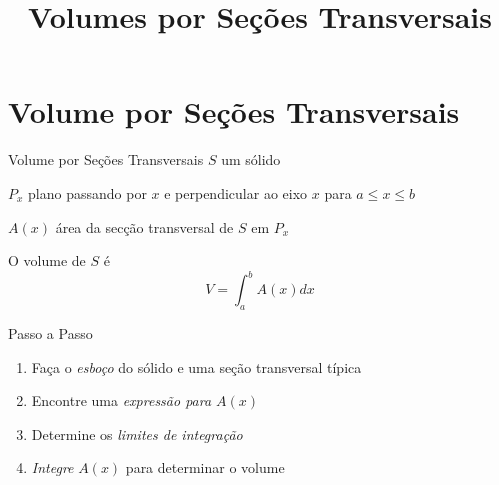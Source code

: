 
\usepackage{integracao_e_series}

\title{Volumes por Seções Transversais}



\addtitle

\section{Volume por Seções Transversais}


\begin{frame}{Volume por Seções Transversais}
  \emph{$S$}    \tabto{10mm} um sólido

  \pause
  \vspace{\baselineskip}
  \emph{$P_x$}  \tabto{10mm} plano passando por $x$ e perpendicular ao
                             eixo $x$ para $a \leq x \leq b$

  \pause
  \vspace{\baselineskip}
  \emph{$A(x)$} \tabto{10mm} área da secção transversal de $S$ em $P_x$

  \pause
  \vspace{\baselineskip}
  O volume de $S$ é
  \[
    V = \int_a^b A(x)dx
  \]
\end{frame}

\begin{frame}{Passo a Passo}
\begin{enumerate}[<+->]
  \setlength\itemsep{1em}
  \item Faça o \emph{esboço} do sólido e uma seção transversal típica
  \item Encontre uma \emph{expressão para $A(x)$}
  \item Determine os \emph{limites de integração}
  \item \emph{Integre} $A(x)$ para determinar o volume
\end{enumerate}
\end{frame}

